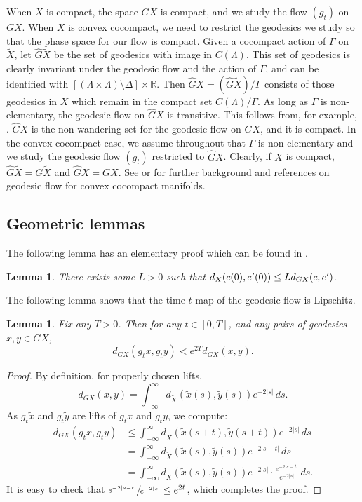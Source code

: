 \documentclass[JEP,XML,SOM,Unicode,NoFloatCountersInSection]{cedram}
\newcommand{\cpr}{c\mkern1mu'}
\newtheorem{lem}[thm]{Lemma}
\theoremstyle{definition}
\numberwithin{equation}{section}
\begin{document}
When $X$ is compact, the space $GX$ is compact, and we study the flow $(g_t)$ on $GX$. When $X$ is convex cocompact, we need to restrict the geodesics we study so that the phase space for our flow is compact. Given a cocompact action of $\Gamma$ on $\tilde X$, let $\hat G\tilde X$ be the set of geodesics with image in $C(\Lambda)$. This set of geodesics is clearly invariant under the geodesic flow and the action of $\Gamma$, and can be identified with $[(\Lambda \times \Lambda)\setminus \Delta]\times \mathbb{R}$. Then $\hat G X = (\hat G\tilde X)/\Gamma$ consists of those geodesics in $X$ which remain in the compact set $C(\Lambda)/\Gamma$. As long as $\Gamma$ is non-elementary, the geodesic flow on $\hat GX$ is transitive. This follows from, for example, \cite[\S8.2]{gromov}. $\hat GX$ is the non-wandering set for the geodesic flow on $GX$, and it is compact. In the convex-cocompact case, we assume throughout that $\Gamma$ is non-elementary and we study the geodesic flow $(g_t)$ restricted to $\hat G X$. Clearly, if $X$ is compact, $\hat G\tilde X = G\tilde X$ and $\hat GX = GX$. See \cite{tapie} or \cite{mB95} for further background and references on geodesic flow for convex cocompact manifolds.

\subsection{Geometric lemmas}

The following lemma has an elementary proof which can be found in \cite[Lem.\,2.8]{CLT}.

\begin{lem}\label{lem:X GX bound}
There exists some $L>0$ such that $d_X(c(0), \cpr(0)) \leq L d_{GX}(c,\cpr)$.
\end{lem}

The following lemma shows that the time-$t$ map of the geodesic flow is Lipschitz.
\begin{lem}\label{lem:Lipschitz}
Fix any $T>0$. Then for any $t\in[0,T]$, and any pairs of geodesics $x,y\in GX$,
\[ d_{GX}(g_t x, g_t y) < e^{2T} d_{GX}(x,y). \]
\end{lem}

\begin{proof}
By definition, for properly chosen lifts,
\[ d_{GX}(x,y) = \int_{-\infty}^\infty d_{\tilde X}(\tilde x(s), \tilde y(s)) e^{-2|s|}\,ds. \]
As $g_t\tilde x$ and $g_t\tilde y$ are lifts of $g_tx$ and $g_ty$, we compute:
\begin{align*}
d_{GX}(g_tx,g_ty) & \leq \int_{-\infty}^\infty d_{\tilde X}(\tilde x(s+t),\tilde y(s+t))e^{-2|s|}\,ds \\
& = \int_{-\infty}^\infty d_{\tilde X}(\tilde x(s),\tilde y(s))e^{-2|s-t|}\,ds \\
& = \int_{-\infty}^\infty d_{\tilde X}(\tilde x(s),\tilde y(s))e^{-2|s|}\cdot \frac{e^{-2|s-t|}}{e^{-2|s|}}\,ds.  
\end{align*}
It is easy to check that $\sfrac{e^{-2|s-t|}}{e^{-2|s|}} \leq e^{2t}$, which completes the proof.
\end{proof}
\end{document}
